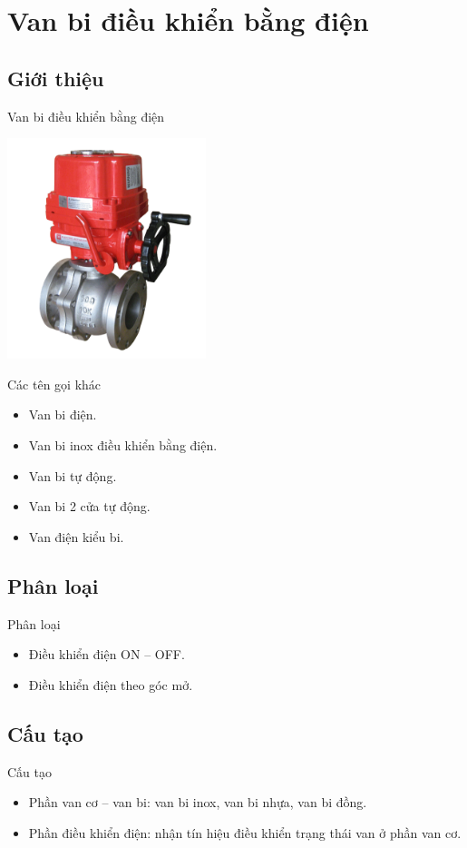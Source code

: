 \documentclass[20pt]{beamer}
\begin{document}
\section{Van bi điều khiển bằng điện}
\subsection*{Giới thiệu}
\begin{frame}{Van bi điều khiển bằng điện}
\begin{center}
\includegraphics[scale=.75]{images/van-bi.png} 
\end{center}
\end{frame}
\begin{frame}{Các tên gọi khác}
\begin{itemize}
\justifying
	\item Van bi điện.
	\item Van bi inox điều khiển bằng điện.
	\item Van bi tự động.
	\item Van bi 2 cửa tự động.
	\item Van điện kiểu bi.
\end{itemize}
\end{frame}
\subsection*{Phân loại}
\begin{frame}{Phân loại}
	\begin{itemize}
	\justifying
		\item Điều khiển điện ON -- OFF.
		
		\item Điều khiển điện theo góc mở.
	\end{itemize}
\end{frame}

\subsection*{Cấu tạo}
\begin{frame}{Cấu tạo}
	\begin{itemize}
	\justifying
		\item Phần van cơ -- van bi: van bi inox, van bi nhựa, van bi đồng.
		
		\item Phần điều khiển điện: nhận tín hiệu điều khiển trạng thái van ở phần van cơ.
	\end{itemize}
\end{frame}
\end{document}
